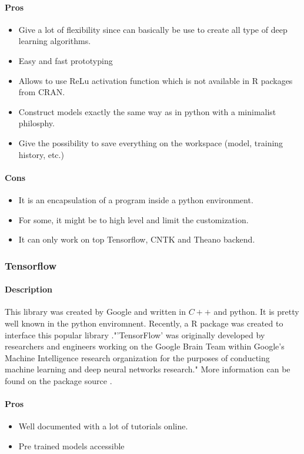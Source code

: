 \documentclass[letter,8pt]{article}\usepackage[]{graphicx}\usepackage[]{color}
\begin{document}
\paragraph{Pros}
\begin{itemize}
\item Give a lot of flexibility since can basically be use to create all type of deep learning algorithms.
\item Easy and fast prototyping
\item Allows to use ReLu activation function which is not available in R packages from CRAN.
\item Construct models exactly the same way as in python with a minimalist philosphy.
\item Give the possibility to save everything on the workspace (model, training history, etc.)
\end{itemize}
\paragraph{Cons}
\begin{itemize}
\item It is an encapsulation of a program inside a python environment.
\item For some, it might be to high level and limit the customization.
\item It can only work on top Tensorflow, CNTK and Theano backend.
\end{itemize}

\subsubsection{Tensorflow}
\paragraph{Description}
This library was created by Google and written in $C++$ and python. It is pretty well known in the python enviromnent. Recently, a R package was created to interface this popular library ."'TensorFlow' was originally developed by researchers and engineers working on the Google Brain Team within Google's Machine Intelligence research organization for the purposes of conducting machine learning and deep neural networks research." More information can be found on the package source \cite{tensorflow2019}.
\paragraph{Pros}
\begin{itemize}
\item Well documented with a lot of tutorials online.
\item Pre trained models accessible
\end{itemize}
\end{document}

